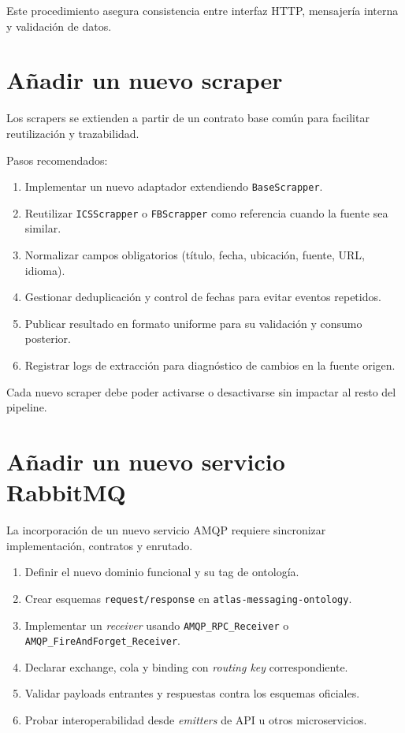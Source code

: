 Este procedimiento asegura consistencia entre interfaz HTTP, mensajería interna y validación de datos.

\section{Añadir un nuevo scraper}

Los scrapers se extienden a partir de un contrato base común para facilitar reutilización y trazabilidad.

Pasos recomendados:

\begin{enumerate}
\item Implementar un nuevo adaptador extendiendo \texttt{BaseScrapper}.
\item Reutilizar \texttt{ICSScrapper} o \texttt{FBScrapper} como referencia cuando la fuente sea similar.
\item Normalizar campos obligatorios (título, fecha, ubicación, fuente, URL, idioma).
\item Gestionar deduplicación y control de fechas para evitar eventos repetidos.
\item Publicar resultado en formato uniforme para su validación y consumo posterior.
\item Registrar logs de extracción para diagnóstico de cambios en la fuente origen.
\end{enumerate}

Cada nuevo scraper debe poder activarse o desactivarse sin impactar al resto del pipeline.

\section{Añadir un nuevo servicio RabbitMQ}

La incorporación de un nuevo servicio AMQP requiere sincronizar implementación, contratos y enrutado.

\begin{enumerate}
\item Definir el nuevo dominio funcional y su tag de ontología.
\item Crear esquemas \texttt{request/response} en \texttt{atlas-messaging-ontology}.
\item Implementar un \textit{receiver} usando \texttt{AMQP\_RPC\_Receiver} o \texttt{AMQP\_FireAndForget\_Receiver}.
\item Declarar exchange, cola y binding con \textit{routing key} correspondiente.
\item Validar payloads entrantes y respuestas contra los esquemas oficiales.
\item Probar interoperabilidad desde \textit{emitters} de API u otros microservicios.
\end{enumerate}

